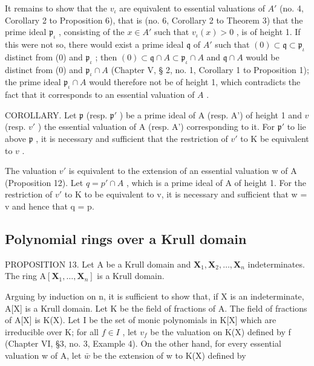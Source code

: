 It remains to show that the \(v_{\iota}\) are equivalent to essential valuations of \(A'\) (no. 4, Corollary 2 to Proposition 6), that is (no. 6, Corollary 2 to Theorem 3) that the prime ideal \(\mathfrak{p}_{\iota}\) , consisting of the \(x \in A'\) such that \(v_{\iota}(x) > 0\) , is of height 1. If this were not so, there would exist a prime ideal \(\mathfrak{q}\) of \(A'\) such that \((0) \subset \mathfrak{q} \subset \mathfrak{p}_{\iota}\) distinct from (0) and \(\mathfrak{p}_{\iota}\) ; then \((0) \subset \mathfrak{q} \cap A \subset \mathfrak{p}_{\iota} \cap A\) and \(\mathfrak{q} \cap A\) would be distinct from (0) and \(\mathfrak{p}_{\iota} \cap A\) (Chapter V, § 2, no. 1, Corollary 1 to Proposition 1); the prime ideal \(\mathfrak{p}_{\iota} \cap A\) would therefore not be of height 1, which contradicts the fact that it corresponds to an essential valuation of \(A\) .

COROLLARY. Let \(\mathfrak{p}\) (resp. \(\mathfrak{p}'\) ) be a prime ideal of A (resp. A') of height 1 and \(v\) (resp. \(v'\) ) the essential valuation of A (resp. A') corresponding to it. For \(\mathfrak{p}'\) to lie above \(\mathfrak{p}\) , it is necessary and sufficient that the restriction of \(v'\) to K be equivalent to \(v\) .

The valuation \(v'\) is equivalent to the extension of an essential valuation w of A (Proposition 12). Let \(q = p' \cap A\) , which is a prime ideal of A of height 1. For the restriction of \(v'\) to K to be equivalent to v, it is necessary and sufficient that w = v and hence that q = p.

\subsection{Polynomial rings over a Krull domain}

PROPOSITION 13. Let A be a Krull domain and \(\mathbf{X}_1, \mathbf{X}_2, \ldots, \mathbf{X}_n\) indeterminates. The ring \(\mathrm{A}[\mathbf{X}_1, \ldots, \mathbf{X}_n]\) is a Krull domain.

Arguing by induction on n, it is sufficient to show that, if X is an indeterminate, A{[}X{]} is a Krull domain. Let K be the field of fractions of A. The field of fractions of A{[}X{]} is K(X). Let I be the set of monic polynomials in K{[}X{]} which are irreducible over K; for all \(f \in I\) , let \(v_{f}\) be the valuation on K(X) defined by f (Chapter VI, §3, no. 3, Example 4). On the other hand, for every essential valuation w of A, let \(\bar{w}\) be the extension of w to K(X) defined by

